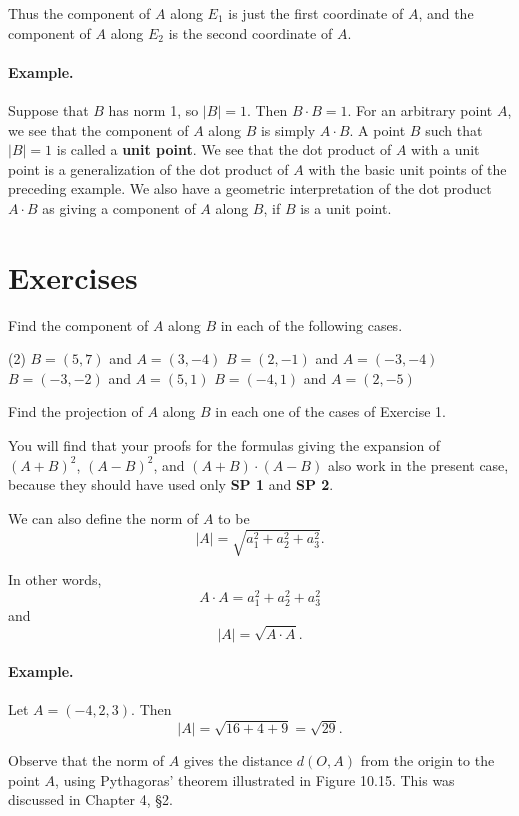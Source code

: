 \documentclass[12pt]{book} %
\begin{document}
\begin{ExerciseList}
Thus the component of $A$ along $E_1$ is just the first coordinate of $A$, and the component of $A$ along $E_2$ is the second coordinate of $A$.

\paragraph{Example.}
Suppose that $B$ has norm 1, so $|B|=1$. Then $B\cdot B=1$. For an arbitrary point $A$, we see that the component of $A$ along $B$ is simply $A\cdot B$. A point $B$ such that $|B|=1$ is called a \textbf{unit point}. We see that the dot product of $A$ with a unit point is a generalization of the dot product of $A$ with the basic unit points of the preceding example. We also have a geometric interpretation of the dot product $A\cdot B$ as giving a component of $A$ along $B$, if $B$ is a unit point.

\section*{Exercises}

\setcounter{Exercise}{0}
\begin{ExerciseList}
\Exercise Find the component of $A$ along $B$ in each of the following cases.
\begin{tasks}(2)
\task[(a)] $B=(5,7)$ and $A=(3,-4)$
\task[(b)] $B=(2,-1)$ and $A=(-3,-4)$
\task[(c)] $B=(-3,-2)$ and $A=(5,1)$
\task[(d)] $B=(-4,1)$ and $A=(2,-5)$
\end{tasks}

\Exercise Find the projection of $A$ along $B$ in each one of the cases of Exercise 1.
\end{ExerciseList}

You will find that your proofs for the formulas giving the expansion
of $(A+B)^2$, $(A-B)^2$, and $(A+B)\cdot(A-B)$ also work in the present
case, because they should have used only \textbf{SP 1} and \textbf{SP 2}.

We can also define the norm of $A$ to be
\[
|A|=\sqrt{a_1^2+a_2^2+a_3^2}.
\]

In other words,
\[
A\cdot A=a_1^2+a_2^2+a_3^2
\]
and
\[
|A|=\sqrt{A\cdot A}.
\]

\paragraph{Example.}
Let $A=(-4,2,3)$. Then
\[
|A|=\sqrt{16+4+9}=\sqrt{29}.
\]

Observe that the norm of $A$ gives the distance $d(O,A)$ from the origin to the point $A$, using Pythagoras' theorem illustrated in Figure 10.15. This was discussed in Chapter 4, \S2.


\end{ExerciseList}
\end{document}
